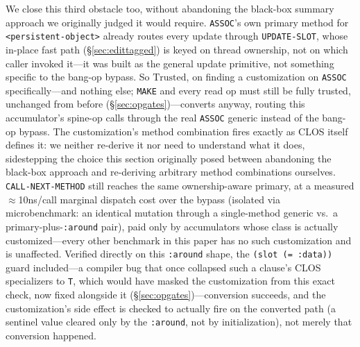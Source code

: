 \documentclass[sigplan,review,anonymous]{acmart}
\begin{document}
We close this third obstacle too, without abandoning the black-box summary approach we originally judged it would require. \texttt{ASSOC}'s own primary method for \texttt{<persistent-object>} already routes every update through \texttt{UPDATE-SLOT}, whose in-place fast path (§\ref{sec:edittagged}) is keyed on thread ownership, not on which caller invoked it---it was built as the general update primitive, not something specific to the bang-op bypass. So $\mathrm{Trusted}$, on finding a customization on \texttt{ASSOC} specifically---and nothing else; \texttt{MAKE} and every read op must still be fully trusted, unchanged from before (§\ref{sec:opgates})---converts anyway, routing this accumulator's spine-op calls through the real \texttt{ASSOC} generic instead of the bang-op bypass. The customization's method combination fires exactly as CLOS itself defines it: we neither re-derive it nor need to understand what it does, sidestepping the choice this section originally posed between abandoning the black-box approach and re-deriving arbitrary method combinations ourselves. \texttt{CALL-NEXT-METHOD} still reaches the same ownership-aware primary, at a measured $\approx$10ns/call marginal dispatch cost over the bypass (isolated via microbenchmark: an identical mutation through a single-method generic vs.\ a primary-plus-\texttt{:around} pair), paid only by accumulators whose class is actually customized---every other benchmark in this paper has no such customization and is unaffected. Verified directly on this \texttt{:around} shape, the \texttt{(slot (= :data))} guard included---a compiler bug that once collapsed such a clause's CLOS specializers to \texttt{T}, which would have masked the customization from this exact check, now fixed alongside it (§\ref{sec:opgates})---conversion succeeds, and the customization's side effect is checked to actually fire on the converted path (a sentinel value cleared only by the \texttt{:around}, not by initialization), not merely that conversion happened.
\end{document}
